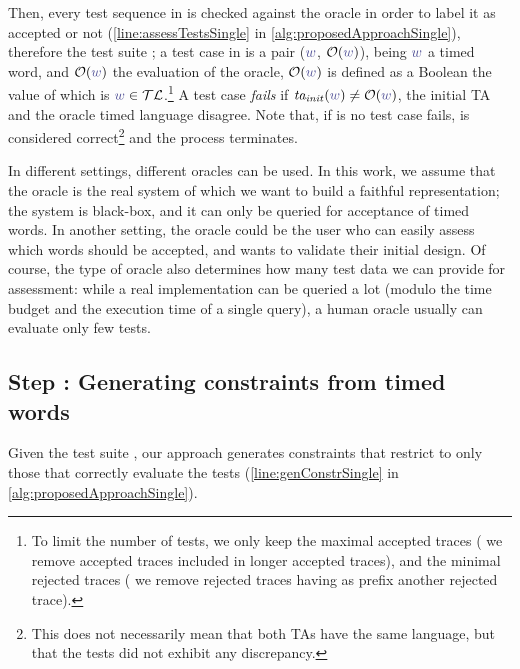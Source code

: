 \begin{tikzborder}{\cite{Gargantini16:validation}}
\begin{tikzborder}{\cite{gargantini_combinatorial_2017}}
\begin{tikzborder}{\cite{gargantini_combinatorial_2017}}
\begin{tikzborder}{\cite{garn2019}}
\begin{tikzborder}{\cite{arcaini2019achieving}}
\begin{tikzborder}{\cite{arcaini2019varivolution}}
\begin{tikzborder}{}
Then, every test sequence in \testData is checked against the oracle in order to label it as accepted or not (\ref{line:assessTestsSingle} in \ref{alg:proposedApproachSingle}), therefore the test suite \testSuiteTA;
a test case in \testSuiteTA is a pair ($\word$, $\oracleTa(\word)$), being $\word$ a timed word, and $\oracleTa(\word)$ the evaluation of the oracle, \ie{} $\oracleTa(\word)$ is defined as a Boolean the value of which is $\word \in \TLoracle$.\footnote{To limit the number of tests, we only keep the maximal accepted traces (\ie{} we remove accepted traces included in longer accepted traces), and the minimal rejected traces (\ie{} we remove rejected traces having as prefix another rejected trace).}
A test case \emph{fails} if $\initTa(\word) \neq \oracleTa(\word)$, \ie{} the initial TA and the oracle timed language disagree. Note that, if is no test case fails, \initTa is considered correct\footnote{%
	This does not necessarily mean that both TAs have the same language, but that the tests did not exhibit any discrepancy.
}
and the process terminates.

In different settings, different oracles can be used. In this work, we assume that the oracle is the real system of which we want to build a faithful representation; the system is black-box, and it can only be queried for acceptance of timed words. In another setting, the oracle could be the user who can easily assess which words should be accepted, and wants to validate their initial design. Of course, the type of oracle also determines how many test data we can provide for assessment: while a real implementation can be queried a lot (modulo the time budget and the execution time of a single query), a human oracle usually can evaluate only few tests.
\end{tikzborder}

\subsection{Step : Generating constraints from timed words}\label{sec:genConstraints}

\begin{tikzborder}{}
Given the test suite \testSuiteTA, our approach generates constraints \ptaConstr that restrict \ptaProc to only those \tas that correctly evaluate the tests (\ref{line:genConstrSingle} in \ref{alg:proposedApproachSingle}).


\end{tikzborder}
\end{tikzborder}
\end{tikzborder}
\end{tikzborder}
\end{tikzborder}
\end{tikzborder}
\end{tikzborder}
